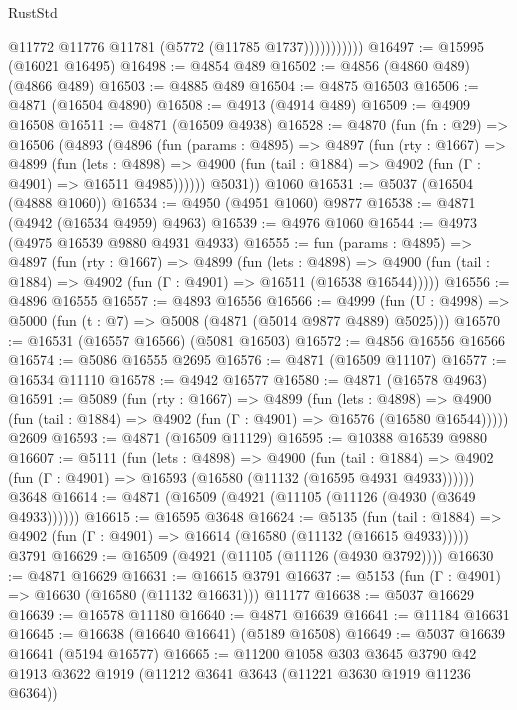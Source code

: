 \begin{lexlean}{RustStd}
\begin{coremodule}
                      @11772
                      @11776
                      @11781
                      (@5772 (@11785 @1737)))))))))))
@16497 := @15995 (@16021 @16495)
@16498 := @4854 @489
@16502 := @4856 (@4860 @489) (@4866 @489)
@16503 := @4885 @489
@16504 := @4875 @16503
@16506 := @4871 (@16504 @4890)
@16508 := @4913 (@4914 @489)
@16509 := @4909 @16508
@16511 := @4871 (@16509 @4938)
@16528 := @4870
    (fun (fn : @29) =>
    @16506
      (@4893
        (@4896
          (fun (params : @4895) =>
          @4897
            (fun (rty : @1667) =>
            @4899
              (fun (lets : @4898) =>
              @4900 (fun (tail : @1884) => @4902 (fun (Γ : @4901) => @16511 @4985))))))
        @5031))
    @1060
@16531 := @5037 (@16504 (@4888 @1060))
@16534 := @4950 (@4951 @1060) @9877
@16538 := @4871 (@4942 (@16534 @4959) @4963)
@16539 := @4976 @1060
@16544 := @4973 (@4975 @16539 @9880 @4931 @4933)
@16555 := fun (params : @4895) =>
  @4897
    (fun (rty : @1667) =>
    @4899
      (fun (lets : @4898) =>
      @4900 (fun (tail : @1884) => @4902 (fun (Γ : @4901) => @16511 (@16538 @16544)))))
@16556 := @4896 @16555
@16557 := @4893 @16556
@16566 := @4999 (fun (U : @4998) => @5000 (fun (t : @7) => @5008 (@4871 (@5014 @9877 @4889) @5025)))
@16570 := @16531 (@16557 @16566) (@5081 @16503)
@16572 := @4856 @16556 @16566
@16574 := @5086 @16555 @2695
@16576 := @4871 (@16509 @11107)
@16577 := @16534 @11110
@16578 := @4942 @16577
@16580 := @4871 (@16578 @4963)
@16591 := @5089
    (fun (rty : @1667) =>
    @4899
      (fun (lets : @4898) =>
      @4900 (fun (tail : @1884) => @4902 (fun (Γ : @4901) => @16576 (@16580 @16544)))))
    @2609
@16593 := @4871 (@16509 @11129)
@16595 := @10388 @16539 @9880
@16607 := @5111
    (fun (lets : @4898) =>
    @4900
      (fun (tail : @1884) =>
      @4902 (fun (Γ : @4901) => @16593 (@16580 (@11132 (@16595 @4931 @4933))))))
    @3648
@16614 := @4871 (@16509 (@4921 (@11105 (@11126 (@4930 (@3649 @4933))))))
@16615 := @16595 @3648
@16624 := @5135
    (fun (tail : @1884) => @4902 (fun (Γ : @4901) => @16614 (@16580 (@11132 (@16615 @4933)))))
    @3791
@16629 := @16509 (@4921 (@11105 (@11126 (@4930 @3792))))
@16630 := @4871 @16629
@16631 := @16615 @3791
@16637 := @5153 (fun (Γ : @4901) => @16630 (@16580 (@11132 @16631))) @11177
@16638 := @5037 @16629
@16639 := @16578 @11180
@16640 := @4871 @16639
@16641 := @11184 @16631
@16645 := @16638 (@16640 @16641) (@5189 @16508)
@16649 := @5037 @16639 @16641 (@5194 @16577)
@16665 := @11200
    @1058
    @303
    @3645
    @3790
    @42
    @1913
    @3622
    @1919
    (@11212 @3641 @3643 (@11221 @3630 @1919 @11236 @6364))

\end{coremodule}
\end{lexlean}
